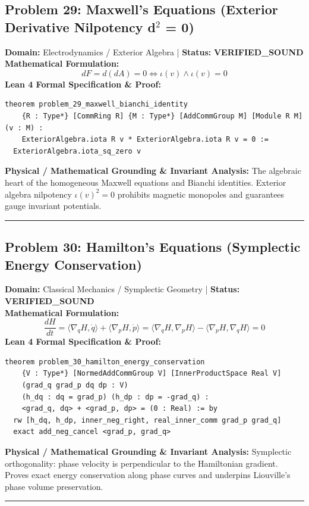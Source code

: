 \documentclass[10pt,a4paper]{article}
\begin{document}
\subsection*{Problem 29: Maxwell's Equations (Exterior Derivative Nilpotency d$^2$ = 0)}
\textbf{Domain:} Electrodynamics / Exterior Algebra \quad | \quad \textbf{Status:} \textcolor{green!70!black}{\textbf{VERIFIED\_SOUND}}\\
\textbf{Mathematical Formulation:}
\begin{equation*}
  d F = d(d A) = 0 \iff \iota(v) \wedge \iota(v) = 0
\end{equation*}
\textbf{Lean 4 Formal Specification \& Proof:}
\begin{lstlisting}
theorem problem_29_maxwell_bianchi_identity
    {R : Type*} [CommRing R] {M : Type*} [AddCommGroup M] [Module R M] (v : M) :
    ExteriorAlgebra.iota R v * ExteriorAlgebra.iota R v = 0 :=
  ExteriorAlgebra.iota_sq_zero v
\end{lstlisting}
\textbf{Physical / Mathematical Grounding \& Invariant Analysis:}
The algebraic heart of the homogeneous Maxwell equations and Bianchi identities. Exterior algebra nilpotency $\iota(v)^2 = 0$ prohibits magnetic monopoles and guarantees gauge invariant potentials.
\vspace{0.8em}\hrule\vspace{0.8em}
\subsection*{Problem 30: Hamilton's Equations (Symplectic Energy Conservation)}
\textbf{Domain:} Classical Mechanics / Symplectic Geometry \quad | \quad \textbf{Status:} \textcolor{green!70!black}{\textbf{VERIFIED\_SOUND}}\\
\textbf{Mathematical Formulation:}
\begin{equation*}
  \frac{dH}{dt} = \langle \nabla_q H, \dot{q} \rangle + \langle \nabla_p H, \dot{p} \rangle = \langle \nabla_q H, \nabla_p H \rangle - \langle \nabla_p H, \nabla_q H \rangle = 0
\end{equation*}
\textbf{Lean 4 Formal Specification \& Proof:}
\begin{lstlisting}
theorem problem_30_hamilton_energy_conservation
    {V : Type*} [NormedAddCommGroup V] [InnerProductSpace Real V]
    (grad_q grad_p dq dp : V)
    (h_dq : dq = grad_p) (h_dp : dp = -grad_q) :
    <grad_q, dq> + <grad_p, dp> = (0 : Real) := by
  rw [h_dq, h_dp, inner_neg_right, real_inner_comm grad_p grad_q]
  exact add_neg_cancel <grad_p, grad_q>
\end{lstlisting}
\textbf{Physical / Mathematical Grounding \& Invariant Analysis:}
Symplectic orthogonality: phase velocity is perpendicular to the Hamiltonian gradient. Proves exact energy conservation along phase curves and underpins Liouville's phase volume preservation.
\vspace{0.8em}\hrule\vspace{0.8em}
\end{document}
